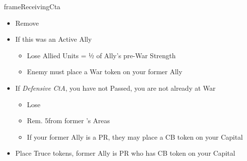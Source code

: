 \documentclass[10pt]{article}
\newlength{\fhReceivingCta} \setlength\fhReceivingCta{\calc{17\baselineskip}}
\begin{document}
\begin{dynamiccontents*}{frameReceivingCta}
\begin{eubox}{\fhReceivingCta}
\begin{multicols}{2}
\begin{itemize}
		\end{itemize}
		\begin{itemize}
			\item Remove \alliance
			\item If this was an Active Ally
			\begin{itemize}
				\item Lose Allied Units = ½ of Ally's pre-War Strength
				\item Enemy must place a War token on your former Ally
			\end{itemize}
			\item If \emph{Defensive CtA},  you have not Passed,  you are not already at War
			\begin{itemize}
				\item Lose 
				\item Rem. 5\influence from former \ally's Areas
				\item If your former Ally is a PR, they may place a CB token on your Capital
			\end{itemize}
			\item Place Truce tokens,  former Ally is PR who has CB token on your Capital
		\end{itemize}
	\end{multicols}
\end{eubox}\end{dynamiccontents*}
\end{document}
